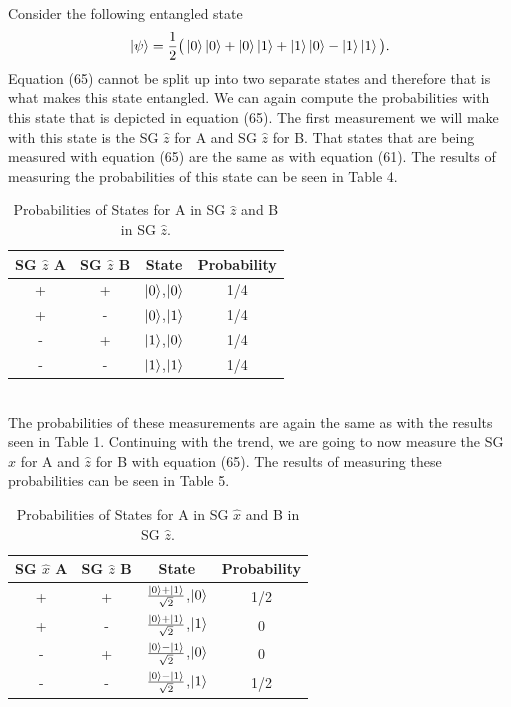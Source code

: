 \documentclass[twocolumn]{article}
\begin{document}
Consider the following entangled state
\begin{equation}
\ket{\psi}=\frac{1}{2}\big(\ket{0}\ket{0}+\ket{0}\ket{1}+\ket{1}\ket{0}-\ket{1}\ket{1}\big).
\end{equation}
Equation (65) cannot be split up into two separate states and therefore that is what makes this state entangled. We can again compute the probabilities with this state that is depicted in equation (65). The first measurement we will make with this state is the SG $\hat{z}$ for A and SG $\hat{z}$ for B. That states that are being measured with equation (65) are the same as with equation (61). The results of measuring the probabilities of this state can be seen in Table 4.
\begin{table}[h!]
\begin{center}
\begin{tabular}{ |c|c|c|c| }
\hline SG $\hat{z}$ A& SG $\hat{z}$ B& State& Probability \\ 
\hline +& +& $\ket{0}$,$\ket{0}$& 1/4 \\  
\hline +& -& $\ket{0}$,$\ket{1}$& 1/4 \\
\hline -& +& $\ket{1}$,$\ket{0}$& 1/4 \\
\hline -& -& $\ket{1}$,$\ket{1}$& 1/4 \\
\hline    
\end{tabular}
\caption{Probabilities of States for A in SG $\hat{z}$ and B in SG $\hat{z}$.}
\end{center}
\end{table} \\
The probabilities of these measurements are again the same as with the results seen in Table 1. Continuing with the trend, we are going to now measure the SG $\hat{x}$ for A and $\hat{z}$ for B with equation (65). The results of measuring these probabilities can be seen in Table 5.
\begin{table}[h!]
\begin{center}
\begin{tabular}{ |c|c|c|c| }
\hline SG $\hat{x}$ A& SG $\hat{z}$ B& State& Probability \\ 
\hline +& +& $\frac{\ket{0}+\ket{1}}{\sqrt{2}}$,$\ket{0}$& 1/2 \\  
\hline +& -& $\frac{\ket{0}+\ket{1}}{\sqrt{2}}$,$\ket{1}$& 0 \\
\hline -& +& $\frac{\ket{0}-\ket{1}}{\sqrt{2}}$,$\ket{0}$& 0 \\
\hline -& -& $\frac{\ket{0}-\ket{1}}{\sqrt{2}}$,$\ket{1}$& 1/2 \\
\hline    
\end{tabular}
\caption{Probabilities of States for A in SG $\hat{x}$ and B in SG $\hat{z}$.}
\end{center}
\end{table} \\
\end{document}
